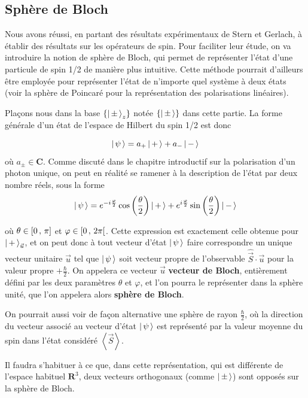 \documentclass{standalone}
\begin{document}
\subsection{Sphère de Bloch}

        Nous avons réussi, en partant des résultats expérimentaux de Stern et Gerlach, à établir des résultats sur les opérateurs de spin. Pour faciliter leur étude, on va introduire la notion de sphère de Bloch, qui permet de représenter l’état d’une particule de spin 1/2 de manière plus intuitive. Cette méthode pourrait d’ailleurs être employée pour représenter l’état de n’importe quel système à deux états (voir la sphère de Poincaré pour la représentation des polarisations linéaires).


        Plaçons nous dans la base $\left\{\left| \, \pm \, \right>_z\right\}$ notée $\left\{\left| \, \pm \, \right>\right\}$ dans cette partie. La forme générale d’un état de l’espace de Hilbert du spin 1/2 est donc 

        \[ \left| \, \psi \, \right>  = a_{+} \left| \, + \, \right> + a_{-} \left| \, - \, \right> \]
        où $a_{\pm} \in \mathbf{C}$. Comme discuté dans le chapitre introductif sur la polarisation d’un photon unique, on peut en réalité se ramener à la description de l’état par deux nombre réels, sous la forme 
        \[ \left| \, \psi \, \right> = e^{- i \frac{\varphi}{2}} \cos\left(\frac{\theta}{2}\right) \left| \, + \, \right> + e^{i \frac{\varphi}{2}} \sin\left(\frac{\theta}{2}\right) \left| \, - \, \right> \]
        
    
        où $\theta \in \left[ 0 \, , \, \pi \right]$ et $\varphi \in \left[ 0 \, , \, 2\pi \right[$. Cette expression est exactement celle obtenue pour $\left| \, + \, \right>_{\vec{u}}$, et on peut donc à tout vecteur d’état $\left| \, \psi \, \right>$ faire correspondre un unique vecteur unitaire $\vec{u}$ tel que $\left| \, \psi \, \right>$ soit vecteur propre de l’observable $\hat{\vec{S}} \cdot \vec{u}$ pour la valeur propre $+\frac{\hbar}{2}$. On appelera ce vecteur $\vec{u}$ \textbf{vecteur de Bloch}, entièrement défini par les deux paramètres $\theta$ et $\varphi$, et l’on pourra le représenter dans la sphère unité, que l’on appelera alors \textbf{sphère de Bloch}.

        On pourrait aussi voir de façon alternative une sphère de rayon $\frac{\hbar}{2}$, où la direction du vecteur associé au vecteur d’état $\left| \, \psi \, \right>$ est représenté par la valeur moyenne du spin dans l’état considéré $\left<\vec{S}\right>$.

        Il faudra s’habituer à ce que, dans cette représentation, qui est différente de l’espace habituel $\mathbf{R}^3$, deux vecteurs orthogonaux (comme $\left| \, \pm \, \right>$) sont opposés sur la sphère de Bloch.
\end{document}
